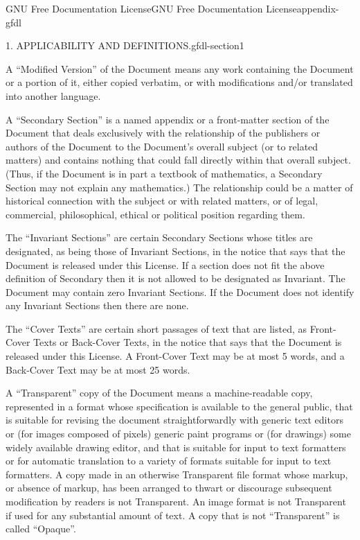 \documentclass[oneside,10pt,]{book}
\numberwithin{equation}{section}
\begin{document}
\begin{appendixptx}{GNU Free Documentation License}{}{GNU Free Documentation License}{}{}{appendix-gfdl}
\begin{paragraphs}{1. APPLICABILITY AND DEFINITIONS.}{gfdl-section1}
\par
\hypertarget{p-706}{}%
A ``Modified Version'' of the Document means any work containing the Document or a portion of it, either copied verbatim, or with modifications and\slash{}or translated into another language.%
\par
\hypertarget{p-707}{}%
A ``Secondary Section'' is a named appendix or a front-matter section of the Document that deals exclusively with the relationship of the publishers or authors of the Document to the Document's overall subject (or to related matters) and contains nothing that could fall directly within that overall subject. (Thus, if the Document is in part a textbook of mathematics, a Secondary Section may not explain any mathematics.) The relationship could be a matter of historical connection with the subject or with related matters, or of legal, commercial, philosophical, ethical or political position regarding them.%
\par
\hypertarget{p-708}{}%
The ``Invariant Sections'' are certain Secondary Sections whose titles are designated, as being those of Invariant Sections, in the notice that says that the Document is released under this License. If a section does not fit the above definition of Secondary then it is not allowed to be designated as Invariant. The Document may contain zero Invariant Sections. If the Document does not identify any Invariant Sections then there are none.%
\par
\hypertarget{p-709}{}%
The ``Cover Texts'' are certain short passages of text that are listed, as Front-Cover Texts or Back-Cover Texts, in the notice that says that the Document is released under this License. A Front-Cover Text may be at most 5 words, and a Back-Cover Text may be at most 25 words.%
\par
\hypertarget{p-710}{}%
A ``Transparent'' copy of the Document means a machine-readable copy, represented in a format whose specification is available to the general public, that is suitable for revising the document straightforwardly with generic text editors or (for images composed of pixels) generic paint programs or (for drawings) some widely available drawing editor, and that is suitable for input to text formatters or for automatic translation to a variety of formats suitable for input to text formatters. A copy made in an otherwise Transparent file format whose markup, or absence of markup, has been arranged to thwart or discourage subsequent modification by readers is not Transparent. An image format is not Transparent if used for any substantial amount of text. A copy that is not ``Transparent'' is called ``Opaque''.%

\end{paragraphs}
\end{appendixptx}
\end{document}

